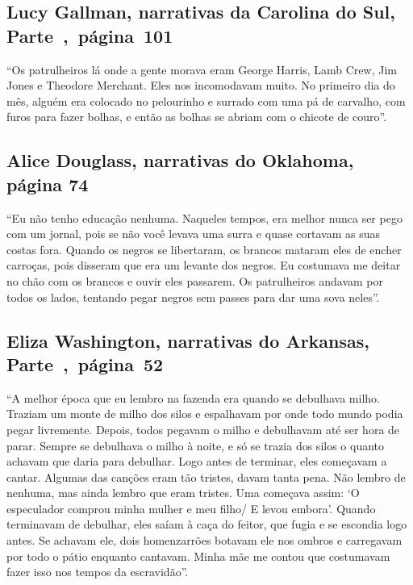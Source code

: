 \subsection{Lucy Gallman, narrativas da Carolina do Sul, Parte~,~página~101}
\label{ref98}

``Os patrulheiros lá onde a gente morava eram George Harris, Lamb Crew,
Jim Jones e Theodore Merchant. Eles nos incomodavam muito. No primeiro
dia do mês, alguém era colocado no pelourinho e surrado com uma pá de
carvalho, com furos para fazer bolhas, e então as bolhas se abriam com o
chicote de couro''.

\subsection{Alice Douglass, narrativas do Oklahoma, página 74} \label{ref73}

``Eu não tenho educação nenhuma. Naqueles tempos, era melhor nunca ser
pego com um jornal, pois se não você levava uma surra e quase cortavam
as suas costas fora. Quando os negros se libertaram, os brancos mataram
eles de encher carroças, pois disseram que era um levante dos negros. Eu
costumava me deitar no chão com os brancos e ouvir eles passarem. Os
patrulheiros andavam por todos os lados, tentando pegar negros sem
passes para dar uma sova neles''.

\subsection{Eliza Washington, narrativas do Arkansas, Parte~,~página~52}
\label{ref278}

``A melhor época que eu lembro na fazenda era quando se debulhava milho.
Traziam um monte de milho dos silos e espalhavam por onde todo mundo
podia pegar livremente. Depois, todos pegavam o milho e debulhavam até
ser hora de parar. Sempre se debulhava o milho à noite, e só se trazia
dos silos o quanto achavam que daria para debulhar. Logo antes de
terminar, eles começavam a cantar. Algumas das canções eram tão tristes,
davam tanta pena. Não lembro de nenhuma, mas ainda lembro que eram
tristes. Uma começava assim: `O especulador comprou minha mulher e meu
filho/ E levou embora'. Quando terminavam de debulhar, eles saíam à
caça do feitor, que fugia e se escondia logo antes. Se achavam ele, dois
homenzarrões botavam ele nos ombros e carregavam por todo o pátio
enquanto cantavam. Minha mãe me contou que costumavam fazer isso nos
tempos da escravidão''.

